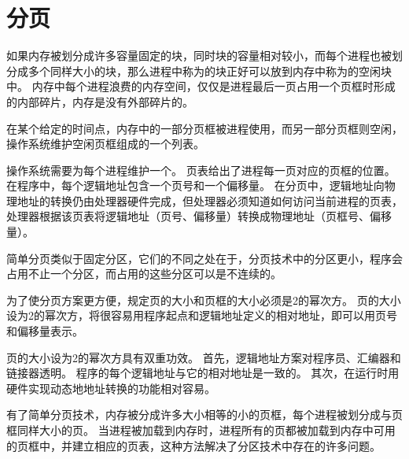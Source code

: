 
\section{分页}
{
    如果内存被划分成许多容量固定的块，同时块的容量相对较小，而每个进程也被划分成多个同样大小的块，那么进程中称为的块正好可以放到内存中称为的空闲块中。
    内存中每个进程浪费的内存空间，仅仅是进程最后一页占用一个页框时形成的内部碎片，内存是没有外部碎片的。

    在某个给定的时间点，内存中的一部分页框被进程使用，而另一部分页框则空闲，操作系统维护空闲页框组成的一个列表。

    操作系统需要为每个进程维护一个。
    页表给出了进程每一页对应的页框的位置。
    在程序中，每个逻辑地址包含一个页号和一个偏移量。
    在分页中，逻辑地址向物理地址的转换仍由处理器硬件完成，但处理器必须知道如何访问当前进程的页表，处理器根据该页表将逻辑地址（页号、偏移量）转换成物理地址（页框号、偏移量）。

    简单分页类似于固定分区，它们的不同之处在于，分页技术中的分区更小，程序会占用不止一个分区，而占用的这些分区可以是不连续的。

    为了使分页方案更方便，规定页的大小和页框的大小必须是2的幂次方。
    页的大小设为2的幂次方，将很容易用程序起点和逻辑地址定义的相对地址，即可以用页号和偏移量表示。

    页的大小设为2的幂次方具有双重功效。
    首先，逻辑地址方案对程序员、汇编器和链接器透明。
    程序的每个逻辑地址与它的相对地址是一致的。
    其次，在运行时用硬件实现动态地地址转换的功能相对容易。

    有了简单分页技术，内存被分成许多大小相等的小的页框，每个进程被划分成与页框同样大小的页。
    当进程被加载到内存时，进程所有的页都被加载到内存中可用的页框中，并建立相应的页表，这种方法解决了分区技术中存在的许多问题。
}
